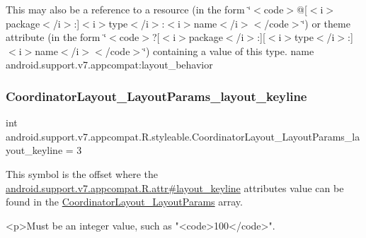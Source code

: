 This may also be a reference to a resource (in the form \char`\"{}$<$code$>$@\mbox{[}$<$i$>$package$<$/i$>$\+:\mbox{]}$<$i$>$type$<$/i$>$\+:$<$i$>$name$<$/i$>$$<$/code$>$\char`\"{}) or theme attribute (in the form \char`\"{}$<$code$>$?\mbox{[}$<$i$>$package$<$/i$>$\+:\mbox{]}\mbox{[}$<$i$>$type$<$/i$>$\+:\mbox{]}$<$i$>$name$<$/i$>$$<$/code$>$\char`\"{}) containing a value of this type.  name android.\+support.\+v7.\+appcompat\+:layout\+\_\+behavior \mbox{\label{classandroid_1_1support_1_1v7_1_1appcompat_1_1R_1_1styleable_a71b92f33ca3d04c4ead0d908659739bf}} 
\subsubsection{\texorpdfstring{Coordinator\+Layout\+\_\+\+Layout\+Params\+\_\+layout\+\_\+keyline}{CoordinatorLayout\_LayoutParams\_layout\_keyline}}
{\footnotesize\ttfamily int android.\+support.\+v7.\+appcompat.\+R.\+styleable.\+Coordinator\+Layout\+\_\+\+Layout\+Params\+\_\+layout\+\_\+keyline = 3\hspace{0.3cm}{\ttfamily [static]}}

This symbol is the offset where the \hyperlink{classandroid_1_1support_1_1v7_1_1appcompat_1_1R_1_1attr_a400f335d8e2223bed92f8a00fc97534f}{android.\+support.\+v7.\+appcompat.\+R.\+attr\#layout\+\_\+keyline} attribute\textquotesingle{}s value can be found in the \hyperlink{classandroid_1_1support_1_1v7_1_1appcompat_1_1R_1_1styleable_aa327c121de57ab2e57c054fff5f5c980}{Coordinator\+Layout\+\_\+\+Layout\+Params} array.

\begin{DoxyVerb}      <p>Must be an integer value, such as "<code>100</code>".
\end{DoxyVerb}
 

